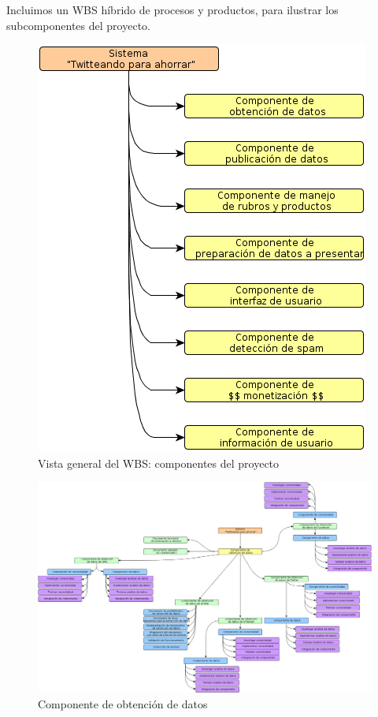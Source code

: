 

\newcommand{\escaladefault}{0.85}



Incluimos un WBS híbrido de procesos y productos, para ilustrar los subcomponentes del proyecto.

\begin{figure}[H]
\centering
\includegraphics[scale=\escaladefault]{graficos/wbs/primera_capa.png}
\caption{Vista general del WBS: componentes del proyecto}
\end{figure}


\begin{figure}[H]
\centering
\includegraphics[scale=\escaladefault]{graficos/wbs/comp_obtencion_datos.png}
\caption{Componente de obtención de datos}
\end{figure}

